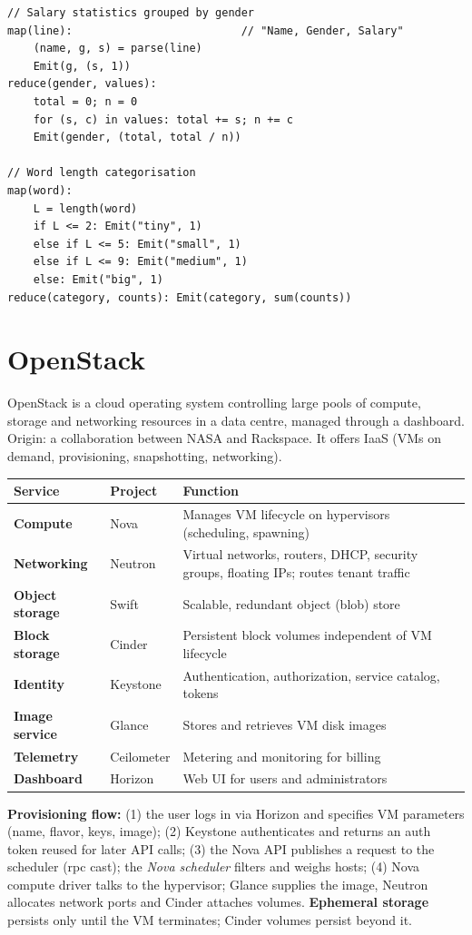 \begin{lstlisting}
// Salary statistics grouped by gender
map(line):                          // "Name, Gender, Salary"
    (name, g, s) = parse(line)
    Emit(g, (s, 1))
reduce(gender, values):
    total = 0; n = 0
    for (s, c) in values: total += s; n += c
    Emit(gender, (total, total / n))

// Word length categorisation
map(word):
    L = length(word)
    if L <= 2: Emit("tiny", 1)
    else if L <= 5: Emit("small", 1)
    else if L <= 9: Emit("medium", 1)
    else: Emit("big", 1)
reduce(category, counts): Emit(category, sum(counts))
\end{lstlisting}

\section{OpenStack}
OpenStack is a cloud operating system controlling large pools of compute, storage and networking resources in a data centre,
managed through a dashboard. Origin: a collaboration between NASA and Rackspace. It offers IaaS (VMs on demand, provisioning,
snapshotting, networking).

\begin{center}
\begin{tabularx}{\textwidth}{>{\bfseries}llX}
\toprule
Service & Project & Function\\
\midrule
Compute & Nova & Manages VM lifecycle on hypervisors (scheduling, spawning)\\
Networking & Neutron & Virtual networks, routers, DHCP, security groups, floating IPs; routes tenant traffic\\
Object storage & Swift & Scalable, redundant object (blob) store\\
Block storage & Cinder & Persistent block volumes independent of VM lifecycle\\
Identity & Keystone & Authentication, authorization, service catalog, tokens\\
Image service & Glance & Stores and retrieves VM disk images\\
Telemetry & Ceilometer & Metering and monitoring for billing\\
Dashboard & Horizon & Web UI for users and administrators\\
\bottomrule
\end{tabularx}
\end{center}

\textbf{Provisioning flow:} (1) the user logs in via Horizon and specifies VM parameters (name, flavor, keys, image); (2) Keystone
authenticates and returns an auth token reused for later API calls; (3) the Nova API publishes a request to the scheduler
(rpc cast); the \emph{Nova scheduler} filters and weighs hosts; (4) Nova compute driver talks to the hypervisor; Glance supplies the image,
Neutron allocates network ports and Cinder attaches volumes. \textbf{Ephemeral storage} persists only until the VM terminates; Cinder
volumes persist beyond it.

